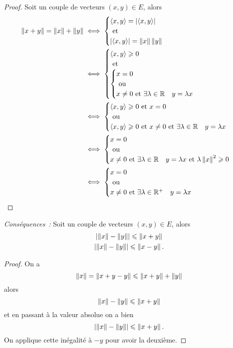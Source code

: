 \begin{proof}
  Soit un couple de  vecteurs $(x,y) \in E$, alors
  \begin{align}
    \left\lVert x+y\right\rVert = \left\lVert x\right\rVert+\left\lVert y\right\rVert &\iff \begin{cases} \left\langle{x},{y}\right\rangle = \left\lvert\left\langle{x},{y}\right\rangle\right\rvert \\ \text{~et~} \\ \left\lvert\left\langle{x},{y}\right\rangle\right\rvert = \left\lVert x\right\rVert\left\lVert y\right\rVert\end{cases} \\
    &\iff  \begin{cases}  \left\langle{x},{y}\right\rangle \geqslant 0 \\ \text{~et~} \\ \begin{cases} x=0 \\ \text{~ou~} \\ x\neq 0 \text{~et~} \exists \lambda \in \mathbb{R} \quad y=\lambda x\end{cases} \end{cases}\\
    & \iff \begin{cases} \left\langle{x},{y}\right\rangle \geqslant 0 \text{~et~} x =0 \\ \text{~ou~} \\  \left\langle{x},{y}\right\rangle \geqslant 0 \text{~et~} x \neq 0 \text{~et~} \exists \lambda \in \mathbb{R} \quad y=\lambda x \end{cases}\\
    & \iff \begin{cases} x=0 \\ \text{~ou~} \\ x \neq 0 \text{~et~} \exists \lambda \in \mathbb{R} \quad y=\lambda x \text{~et~} \lambda\left\lVert x\right\rVert^2 \geqslant 0 \end{cases} \\
      & \iff \begin{cases} x=0 \\ \text{~ou~} \\ x \neq 0 \text{~et~} \exists \lambda \in \mathbb{R}^{+} \quad y=\lambda x \end{cases}
  \end{align}
\end{proof}

\emph{Conséquences~:} Soit un couple de  vecteurs $(x,y) \in E$, alors
\begin{gather}
  \left\lvert\left\lVert x\right\rVert-\left\lVert y\right\rVert\right\rvert \leqslant \left\lVert x+y\right\rVert\\
  \left\lvert\left\lVert x\right\rVert-\left\lVert y\right\rVert\right\rvert \leqslant \left\lVert x-y\right\rVert.
\end{gather}
\begin{proof}
  On a
  \begin{equation}
    \left\lVert x\right\rVert = \left\lVert x+y-y\right\rVert \leqslant \left\lVert x+y\right\rVert +\left\lVert y\right\rVert
  \end{equation}
  alors
  \begin{equation}
    \left\lVert x\right\rVert - \left\lVert y\right\rVert \leqslant \left\lVert x+y\right\rVert
  \end{equation}
  et en passant à la valeur absolue on a bien
  \begin{equation}
    \left\lvert\left\lVert x\right\rVert-\left\lVert y\right\rVert\right\rvert \leqslant \left\lVert x+y\right\rVert.
  \end{equation}
  On applique cette inégalité à $-y$ pour avoir la deuxième.
\end{proof}

